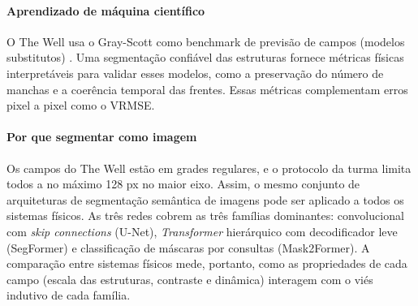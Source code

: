 \paragraph{Aprendizado de máquina científico} O The Well usa o Gray-Scott como benchmark de
previsão de campos (modelos substitutos) \cite{ohana2024well}. Uma segmentação confiável das
estruturas fornece métricas físicas interpretáveis para validar esses modelos, como a preservação
do número de manchas e a coerência temporal das frentes. Essas métricas complementam erros
pixel a pixel como o VRMSE.

\paragraph{Por que segmentar como imagem} Os campos do The Well estão em grades regulares, e o
protocolo da turma limita todos a no máximo 128 px no maior eixo. Assim, o mesmo conjunto de
arquiteturas de segmentação semântica de imagens pode ser aplicado a todos os sistemas físicos. As
três redes cobrem as três famílias dominantes: convolucional com \emph{skip connections} (U-Net),
\emph{Transformer} hierárquico com decodificador leve (SegFormer) e classificação de máscaras por
consultas (Mask2Former). A comparação entre sistemas físicos mede, portanto, como as propriedades de
cada campo (escala das estruturas, contraste e dinâmica) interagem com o viés indutivo de cada
família.
